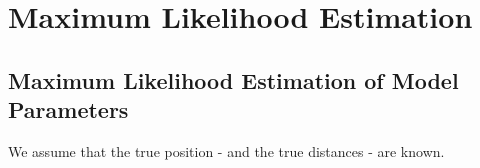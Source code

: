 


%    
%    


\tableofcontents






\newpage

\chapter{Maximum Likelihood Estimation}

\section{Maximum Likelihood Estimation of Model Parameters}

We assume that the true position - and the true distances - are known.

